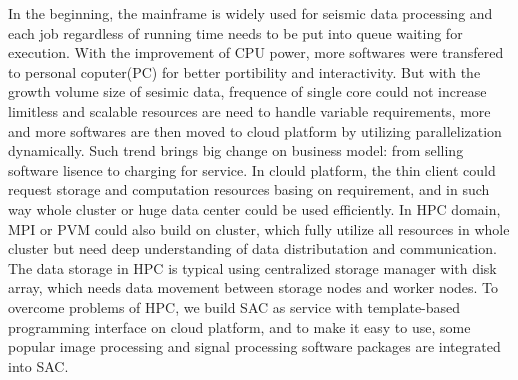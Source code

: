 In the beginning, the mainframe is widely used for seismic data processing and each job regardless of running time needs to be put into queue waiting for execution. With the improvement of CPU power, more softwares were transfered to personal coputer(PC) for better portibility and interactivity. But with the growth volume size of sesimic data, frequence of single core could not increase limitless and scalable resources are need to handle variable requirements, more and more softwares are then moved to cloud platform by utilizing parallelization dynamically. Such trend brings big change on business model: from selling software lisence to charging for service. In clould platform, the thin client could request storage and computation resources basing on requirement, and in such way whole cluster or huge data center could be used efficiently. In HPC domain, MPI or PVM could also build on cluster, which fully utilize all resources in whole cluster but need deep understanding of data distributation and communication. The data storage in HPC is typical using centralized storage manager with disk array, which needs data movement between storage nodes and worker nodes. To overcome problems of HPC, we build SAC as service with template-based programming interface on cloud platform, and to make it easy to use, some popular image processing and signal processing software packages are integrated into SAC.  


